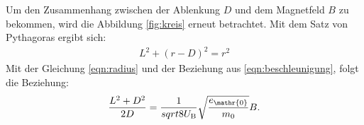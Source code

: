 Um den Zusammenhang zwischen der Ablenkung $D$ und dem Magnetfeld $B$ zu bekommen, wird die Abbildung \ref{fig:kreis} erneut betrachtet.
Mit dem Satz von Pythagoras ergibt sich:
\begin{align}
  L^2+(r-D)^2=r^2
\end{align}
Mit der Gleichung \eqref{eqn:radius} und der Beziehung aus \eqref{eqn:beschleunigung}, folgt die Beziehung:
\begin{align}
  \frac{L^2+D^2}{2D}=\frac{1}{sqrt{8U_\mathrm{B}}}\sqrt{\frac{e_\mathr{0}}{m_\mathrm{0}}}B.
\end{align}
